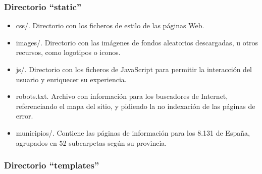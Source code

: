 \subsubsection{Directorio ``static''}

\begin{itemize}
	\item css/. Directorio con los ficheros de estilo de las páginas Web.
	\item images/. Directorio con las imágenes de fondos aleatorios descargadas, u otros recursos, como logotipos o iconos.
	\item js/. Directorio con los ficheros de JavaScript para permitir la interacción del usuario y enriquecer su experiencia.
	\item robots.txt. Archivo con información para los buscadores de Internet, referenciando el mapa del sitio, y pidiendo la no indexación de las páginas de error.
    \item municipios/. Contiene las páginas de información para los 8.131 de España, agrupados en 52 subcarpetas según su provincia.

\end{itemize}

\subsubsection{Directorio ``templates''}

